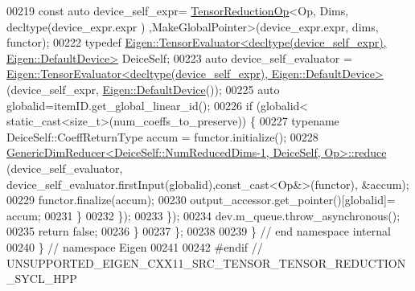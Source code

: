 \begin{DoxyCode}
00219         \textcolor{keyword}{const} \textcolor{keyword}{auto} device\_self\_expr= \hyperlink{class_eigen_1_1_tensor_reduction_op}{TensorReductionOp}<Op, Dims, decltype(device\_expr.expr
      ) ,MakeGlobalPointer>(device\_expr.expr, dims, functor);
00222         \textcolor{keyword}{typedef} 
      \hyperlink{struct_eigen_1_1_tensor_evaluator}{Eigen::TensorEvaluator<decltype(device\_self\_expr), Eigen::DefaultDevice>}
       DeiceSelf;
00223         \textcolor{keyword}{auto} device\_self\_evaluator = 
      \hyperlink{struct_eigen_1_1_tensor_evaluator}{Eigen::TensorEvaluator<decltype(device\_self\_expr), Eigen::DefaultDevice>}
      (device\_self\_expr, \hyperlink{struct_eigen_1_1_default_device}{Eigen::DefaultDevice}());
00225         \textcolor{keyword}{auto} globalid=itemID.get\_global\_linear\_id();
00226         \textcolor{keywordflow}{if} (globalid< static\_cast<size\_t>(num\_coeffs\_to\_preserve)) \{
00227           \textcolor{keyword}{typename} DeiceSelf::CoeffReturnType accum = functor.initialize();
00228           \hyperlink{struct_eigen_1_1internal_1_1_generic_dim_reducer}{GenericDimReducer<DeiceSelf::NumReducedDims-1, DeiceSelf, Op>::reduce}
      (device\_self\_evaluator, device\_self\_evaluator.firstInput(globalid),\textcolor{keyword}{const\_cast<}Op&\textcolor{keyword}{>}(functor), &accum);
00229           functor.finalize(accum);
00230           output\_accessor.get\_pointer()[globalid]= accum;
00231         \}
00232       \});
00233     \});
00234   dev.m\_queue.throw\_asynchronous();
00235     \textcolor{keywordflow}{return} \textcolor{keyword}{false};
00236   \}
00237 \};
00238 
00239 \}  \textcolor{comment}{// end namespace internal}
00240 \}  \textcolor{comment}{// namespace Eigen}
00241 
00242 \textcolor{preprocessor}{#endif  // UNSUPPORTED\_EIGEN\_CXX11\_SRC\_TENSOR\_TENSOR\_REDUCTION\_SYCL\_HPP}
\end{DoxyCode}
